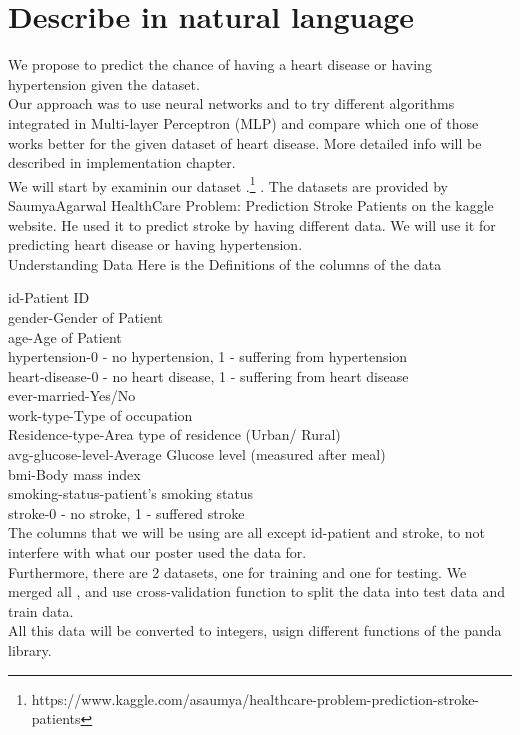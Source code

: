 \section{Describe in natural language}

\tab We propose to predict the chance of having a heart disease or having hypertension given the dataset.\\
\tab Our approach was to use neural networks and to try different algorithms integrated in Multi-layer Perceptron (MLP) and compare which one of those works better for the given dataset of heart disease. More detailed info will be described in implementation chapter.\\

\tab We will start by examinin our dataset .\footnote{https://www.kaggle.com/asaumya/healthcare-problem-prediction-stroke-patients} . The datasets are provided by SaumyaAgarwal HealthCare Problem: Prediction Stroke Patients on the kaggle website. He used it to predict stroke by having different data. We will use it for predicting  heart disease or having hypertension.\\

\tab Understanding Data
Here is the Definitions of the columns of the data

id-Patient ID\\
gender-Gender of Patient\\
age-Age of Patient\\
hypertension-0 - no hypertension, 1 - suffering from hypertension\\
heart-disease-0 - no heart disease, 1 - suffering from heart disease\\
ever-married-Yes/No\\
work-type-Type of occupation\\
Residence-type-Area type of residence (Urban/ Rural)\\
avg-glucose-level-Average Glucose level (measured after meal)\\
bmi-Body mass index\\
smoking-status-patient’s smoking status\\
stroke-0 - no stroke, 1 - suffered stroke\\

\tab The columns that we will be using are all except id-patient and stroke, to not interfere with what our poster used the data for.\\
\tab Furthermore, there are 2 datasets, one for training and one for testing. We merged all , and use cross-validation function to split the data into test data and train data.\\

\tab All this data will be converted to integers, usign different functions of the panda library.\\ 